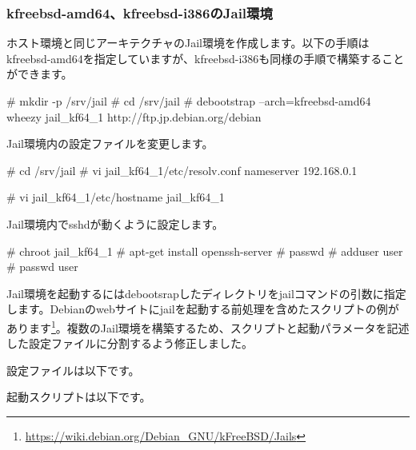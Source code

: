 \documentclass[mingoth,a4paper]{jsarticle}
\begin{document}
\subsubsection{kfreebsd-amd64、kfreebsd-i386のJail環境}

ホスト環境と同じアーキテクチャのJail環境を作成します。以下の手順はkfreebsd-amd64を指定していますが、kfreebsd-i386も同様の手順で構築することができます。

\begin{commandline}
# mkdir -p /srv/jail
# cd /srv/jail
# debootstrap --arch=kfreebsd-amd64 wheezy jail_kf64_1 http://ftp.jp.debian.org/debian
\end{commandline}

Jail環境内の設定ファイルを変更します。

\begin{commandline}
# cd /srv/jail
# vi jail_kf64_1/etc/resolv.conf
nameserver 192.168.0.1

# vi jail_kf64_1/etc/hostname
jail_kf64_1
\end{commandline}

Jail環境内でsshdが動くように設定します。

\begin{commandline}
# chroot jail_kf64_1
# apt-get install openssh-server
# passwd
# adduser user
# passwd user
\end{commandline}

Jail環境を起動するにはdebootsrapしたディレクトリをjailコマンドの引数に指定します。Debianのwebサイトにjailを起動する前処理を含めたスクリプトの例があります\footnote{\url{https://wiki.debian.org/Debian_GNU/kFreeBSD/Jails}}。複数のJail環境を構築するため、スクリプトと起動パラメータを記述した設定ファイルに分割するよう修正しました。

設定ファイルは以下です。


起動スクリプトは以下です。
\end{document}
